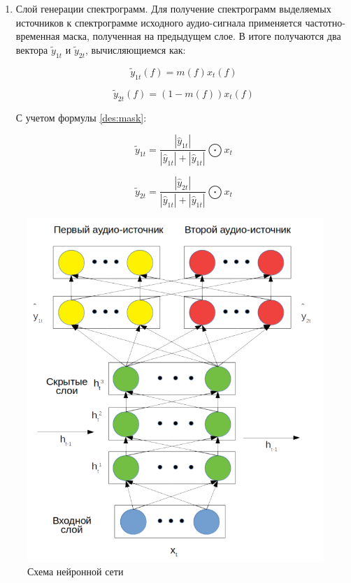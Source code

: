 \begin{enumerate}
	\item Слой генерации спектрограмм. Для получение спектрограмм выделяемых источников к спектрограмме исходного аудио-сигнала применяется частотно-временная маска, полученная на предыдущем слое. В итоге получаются два вектора $\tilde{y}_{1t}$ и $\tilde{y}_{2t}$, вычисляющиемся как:
	
	\begin{equation}
	\tilde{y}_{1t}(f) = m(f)x_t(f)
	\end{equation}
	
	
	\begin{equation}
	\tilde{y}_{2t}(f) = (1 - m(f))x_t(f)
	\end{equation}
	
	С учетом формулы \ref{des:mask}:
	
	\begin{equation}
	\tilde{y}_{1t} = \frac{|\hat{y}_{1t}|}{|\hat{y}_{1t}| + |\hat{y}_{1t}|} \bigodot x_t
	\end{equation}
	
	
	\begin{equation}
	\tilde{y}_{2t} = \frac{|\hat{y}_{2t}|}{|\hat{y}_{1t}| + |\hat{y}_{1t}|} \bigodot x_t
	\end{equation}
	
\end{enumerate}

\begin{figure}
	\centering
	\includegraphics[width=\textwidth]{inc/img/drnn-design}
	\caption{Схема нейронной сети}
	\label{des:drnn}
\end{figure}


